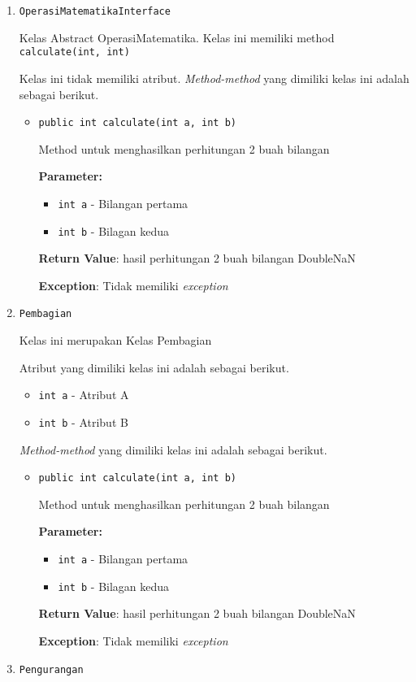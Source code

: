 \documentclass{article}
\begin{document}
\begin{enumerate}
\item \texttt{OperasiMatematikaInterface}

Kelas Abstract OperasiMatematika. Kelas ini memiliki method \texttt{calculate(int, int)}

Kelas ini tidak memiliki atribut. \textit{Method-method} yang dimiliki kelas ini adalah sebagai berikut.
\begin{itemize}
\item \texttt{public int calculate(int a, int b)}

Method untuk menghasilkan perhitungan 2 buah bilangan

\textbf{Parameter:}
\begin{itemize}
\item \texttt{int a} - 
Bilangan pertama
\item \texttt{int b} - 
Bilagan kedua
\end{itemize}
\textbf{Return Value}: hasil perhitungan 2 buah bilangan  DoubleNaN

\textbf{Exception}: Tidak memiliki \textit{exception}

\end{itemize}
\item \texttt{Pembagian}

Kelas ini merupakan Kelas Pembagian

Atribut yang dimiliki kelas ini adalah sebagai berikut.
\begin{itemize}
\item \texttt{int a} - Atribut A
\item \texttt{int b} - Atribut B
\end{itemize}
\textit{Method-method} yang dimiliki kelas ini adalah sebagai berikut.
\begin{itemize}
\item \texttt{public int calculate(int a, int b)}

Method untuk menghasilkan perhitungan 2 buah bilangan

\textbf{Parameter:}
\begin{itemize}
\item \texttt{int a} - 
Bilangan pertama
\item \texttt{int b} - 
Bilagan kedua
\end{itemize}
\textbf{Return Value}: hasil perhitungan 2 buah bilangan  DoubleNaN

\textbf{Exception}: Tidak memiliki \textit{exception}

\end{itemize}
\item \texttt{Pengurangan}


\end{enumerate}
\end{document}
